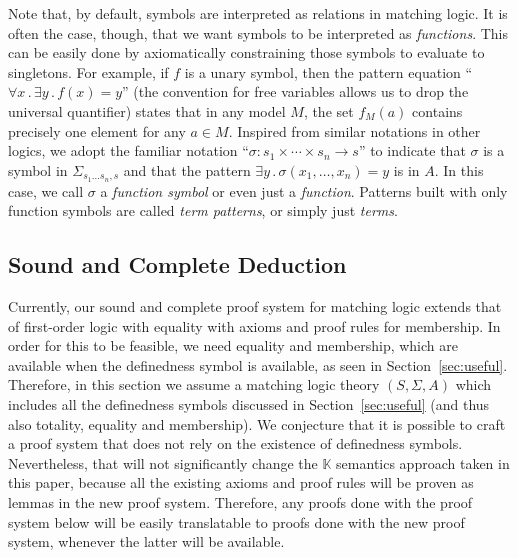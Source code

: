\documentclass[UTF8,11pt]{article}
\theoremstyle{plain}
\theoremstyle{definition}
\theoremstyle{remark}
\newcommand{\K}{\mbox{$\mathbb{K}$}\xspace}
\newcommand{\ra}{\rightarrow}
\begin{document}
Note that, by default, symbols are interpreted as relations in matching logic.
It is often the case, though, that we want symbols to be interpreted as
\emph{functions}.
This can be easily done by axiomatically constraining those symbols to evaluate to
singletons.
For example, if $f$ is a unary symbol, then the pattern equation
``$\forall x\,.\,\exists y\,.\,f(x) = y$'' (the convention for free variables
allows us to drop the universal quantifier) states that in any model
$M$, the set $f_M(a)$ contains precisely one element for any $a\in M$.
%
Inspired from similar notations in other logics,
we adopt the familiar notation
``$\sigma : s_1 \times \cdots \times s_n \ra s$''
to indicate that $\sigma$ is a symbol in $\Sigma_{s_1\ldots s_n,s}$ and that
the pattern
$
\exists y\,.\,\sigma(x_1,\ldots,x_n) = y
$ is in $A$.
In this case, we call $\sigma$ a \emph{function symbol} or even just a
\emph{function}.
Patterns built with only function symbols are called
\emph{term patterns}, or simply just \emph{terms}.


\subsection{Sound and Complete Deduction}

Currently, our sound and complete proof system for matching logic extends that
of first-order logic with equality with axioms and proof rules for membership.
In order for this to be feasible, we need equality and membership, which are
available when the definedness symbol is available, as seen in
Section~\ref{sec:useful}.
Therefore, in this section we assume a matching logic theory $(S,\Sigma,A)$
which includes all the definedness symbols discussed in Section~\ref{sec:useful}
(and thus also totality, equality and membership).
We conjecture that it is possible to craft a proof system that does not rely on
the existence of definedness symbols.
Nevertheless, that will not significantly change the \K semantics approach taken
in this paper, because all the existing axioms and proof rules will be proven as
lemmas in the new proof system.
Therefore, any proofs done with the proof system below will be easily translatable
to proofs done with the new proof system, whenever the latter will be available.

\newcommand{\sequent}[2]{{#1}\vdash{#2}}
\end{document}
